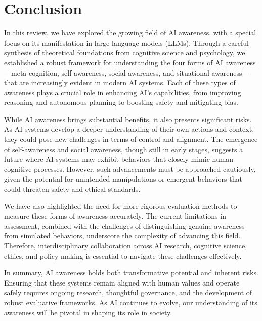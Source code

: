 \section{Conclusion}
\label{sec:conclusion}

In this review, we have explored the growing field of AI awareness, with a special focus on its manifestation in large language models (LLMs). Through a careful synthesis of theoretical foundations from cognitive science and psychology, we established a robust framework for understanding the four forms of AI awareness---meta-cognition, self-awareness, social awareness, and situational awareness---that are increasingly evident in modern AI systems. Each of these types of awareness plays a crucial role in enhancing AI's capabilities, from improving reasoning and autonomous planning to boosting safety and mitigating bias.

While AI awareness brings substantial benefits, it also presents significant risks. As AI systems develop a deeper understanding of their own actions and context, they could pose new challenges in terms of control and alignment. The emergence of self-awareness and social awareness, though still in early stages, suggests a future where AI systems may exhibit behaviors that closely mimic human cognitive processes. However, such advancements must be approached cautiously, given the potential for unintended manipulations or emergent behaviors that could threaten safety and ethical standards.

We have also highlighted the need for more rigorous evaluation methods to measure these forms of awareness accurately. The current limitations in assessment, combined with the challenges of distinguishing genuine awareness from simulated behaviors, underscore the complexity of advancing this field. Therefore, interdisciplinary collaboration across AI research, cognitive science, ethics, and policy-making is essential to navigate these challenges effectively.

In summary, AI awareness holds both transformative potential and inherent risks. Ensuring that these systems remain aligned with human values and operate safely requires ongoing research, thoughtful governance, and the development of robust evaluative frameworks. As AI continues to evolve, our understanding of its awareness will be pivotal in shaping its role in society.



